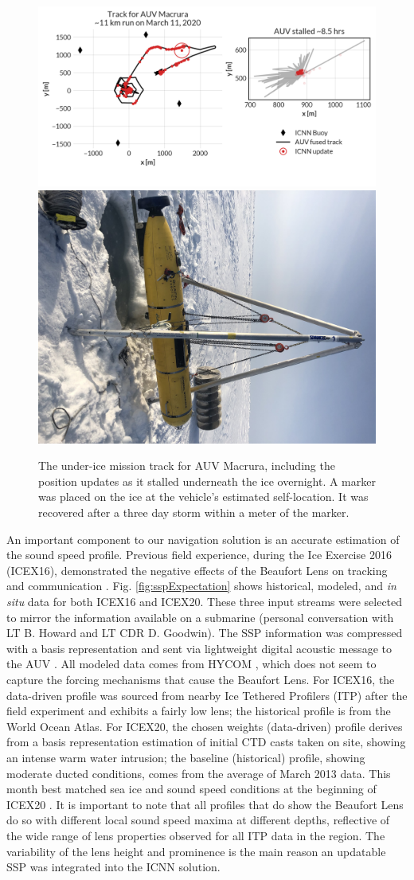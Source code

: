 \begin{figure}[h!]
	\centering
	\includegraphics[width=0.7\columnwidth]{figs/auv-track-update.png} \hfill
	\includegraphics[width=0.28\columnwidth]{figs/Fig1.jpg}
	\caption{The under-ice mission track for AUV Macrura, including the position updates as it stalled underneath the ice overnight. A marker was placed on the ice at the vehicle's estimated self-location. It was recovered after a three day storm within a meter of the marker.}
	\label{fig:vehicleRecovery}
\end{figure}

An important component to our navigation solution is an accurate estimation of the sound speed profile.
Previous field experience, during the Ice Exercise 2016 (ICEX16), demonstrated the negative effects of the Beaufort Lens on tracking and communication \citep{schmidt2016acoustic}.
Fig. \ref{fig:sspExpectation} shows historical, modeled, and \textit{in situ} data for both ICEX16 and ICEX20.
These three input streams were selected to mirror the information available on a submarine (personal conversation with LT B. Howard and LT CDR D. Goodwin). 
The SSP information was compressed with a basis representation and sent via lightweight digital acoustic message to the AUV \citep{bhatt_embedded_2021}. 
All modeled data comes from HYCOM \cite{chassignet_hycom_2007}, which does not seem to capture the forcing mechanisms that cause the Beaufort Lens.
For ICEX16, the data-driven profile was sourced from nearby Ice Tethered Profilers (ITP) after the field experiment \cite{krishfield2008automated,toole2011ice} and exhibits a fairly low lens; the historical profile is from the World Ocean Atlas.
For ICEX20, the chosen weights (data-driven) profile derives from a basis representation estimation of initial CTD casts taken on site, showing an intense warm water intrusion; the baseline (historical) profile, showing moderate ducted conditions, comes from the average of March 2013 data.
This month best matched sea ice and sound speed conditions at the beginning of ICEX20 \citep{bhatt_embedded_2021}.
It is important to note that all profiles that do show the Beaufort Lens do so with different local sound speed maxima at different depths, reflective of the wide range of lens properties observed for all ITP data in the region.
The variability of the lens height and prominence is the main reason an updatable SSP was integrated into the ICNN solution.

